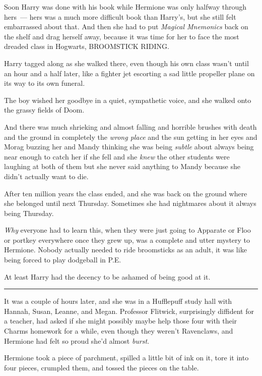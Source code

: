 Soon Harry was done with his book while Hermione was only halfway through hers~--- hers was a much more difficult book than Harry's, but she still felt embarrassed about that. And then she had to put \emph{Magical Mnemonics} back on the shelf and drag herself away, because it was time for her to face the most dreaded class in Hogwarts, BROOMSTICK RIDING.

Harry tagged along as she walked there, even though his own class wasn't until an hour and a half later, like a fighter jet escorting a sad little propeller plane on its way to its own funeral.

The boy wished her goodbye in a quiet, sympathetic voice, and she walked onto the grassy fields of Doom.

And there was much shrieking and almost falling and horrible brushes with death and the ground in completely the \emph{wrong place} and the sun getting in her eyes and Morag buzzing her and Mandy thinking she was being \emph{subtle} about always being near enough to catch her if she fell and she \emph{knew} the other students were laughing at both of them but she never said anything to Mandy because she didn't actually want to die.

After ten million years the class ended, and she was back on the ground where she belonged until next Thursday. Sometimes she had nightmares about it always being Thursday.

\emph{Why} everyone had to learn this, when they were just going to Apparate or Floo or portkey everywhere once they grew up, was a complete and utter mystery to Hermione. Nobody actually needed to ride broomsticks as an adult, it was like being forced to play dodgeball in P.E.

At least Harry had the decency to be ashamed of being good at it.

\begin{center}\rule{3in}{0.4pt}\end{center}

It was a couple of hours later, and she was in a Hufflepuff study hall with Hannah, Susan, Leanne, and Megan. Professor Flitwick, surprisingly diffident for a teacher, had asked if she might possibly maybe help those four with their Charms homework for a while, even though they weren't Ravenclaws, and Hermione had felt so proud she'd almost \emph{burst}.

Hermione took a piece of parchment, spilled a little bit of ink on it, tore it into four pieces, crumpled them, and tossed the pieces on the table.

